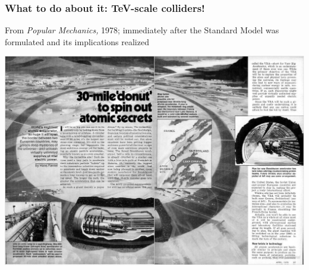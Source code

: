 \documentclass[compress]{beamer}
\begin{document}


\begin{frame}
\frametitle{What to do about it: TeV-scale colliders!}

From {\it Popular Mechanics,} 1978; immediately after the Standard
Model was formulated and its implications realized

\includegraphics[width=\linewidth]{popular_mechanics.png}
\end{frame}
\end{document}
